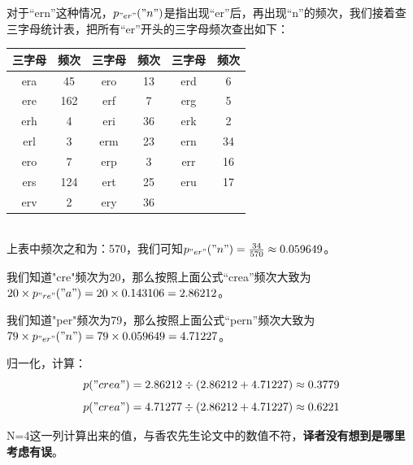 \documentclass[]{article}
\begin{document}
对于“ern”这种情况，$p_{"er"}("n")$是指出现“er”后，再出现“n”的频次，我们接着查三字母统计表，把所有“er”开头的三字母频次查出如下：\\
\begin{tabular}{|c|c||c|c||c|c|}
	\hline 
	三字母&频次 & 三字母 & 频次 & 三字母 & 频次 \\ 
	\hline 
	era& 45 & ero & 13 & erd & 6 \\ 
	\hline 
	ere& 162 & erf & 7 & erg & 5 \\ 
	\hline 
	erh& 4 & eri & 36 & erk & 2 \\ 
	\hline 
	erl& 3 & erm & 23 & ern & 34 \\ 
	\hline 
	ero& 7 & erp & 3 & err & 16 \\ 
	\hline 
	ers& 124 & ert & 25 & eru & 17 \\ 
	\hline 	
	erv& 2 & ery & 36 &  &  \\ 
	\hline 
\end{tabular} 
\\
上表中频次之和为：570，我们可知$p_{"er"}("n")=\frac{34}{570}\approx 0.059649$。

我们知道"cre"频次为20，那么按照上面公式“crea”频次大致为$20\times p_{"re"}("a")=20\times 0.143106=2.86212$。


我们知道"per"频次为79，那么按照上面公式“pern”频次大致为$79\times p_{"er"}("n")=79\times 0.059649=4.71227$。

归一化，计算：
\[p("crea")=2.86212 \div (2.86212+4.71227)\approx 0.3779\]
\[p("crea")=4.71277 \div (2.86212+4.71227)\approx 0.6221\]

N=4这一列计算出来的值，与香农先生论文中的数值不符，\textbf{译者没有想到是哪里考虑有误}。
\end{document}
